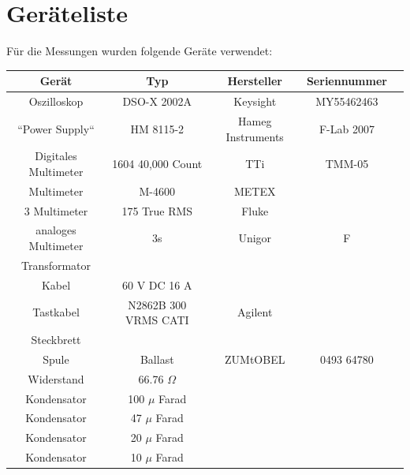 \documentclass[11pt,ngerman]{scrartcl}
\begin{document}
\section{Geräteliste}

\noindent Für die Messungen wurden folgende Geräte verwendet:

\begin{center}
	\begin{tabular}{|c|c|c|c|c|} \hline
		\textbf{Gerät}       & \textbf{Typ}         & \textbf{Hersteller} & \textbf{Seriennummer} \\ \hline

		Oszilloskop          & DSO-X 2002A          & Keysight            & MY55462463            \\ \hline
		``Power Supply``     & HM 8115-2            & Hameg Instruments   & F-Lab 2007            \\ \hline
		Digitales Multimeter & 1604 40,000 Count    & TTi                 & TMM-05                \\ \hline
		Multimeter           & M-4600               & METEX               &                       \\ \hline
		3 Multimeter         & 175 True RMS         & Fluke               &                       \\ \hline
		analoges Multimeter  & 3s                   & Unigor              & F                     \\ \hline
		Transformator        &                      &                     &                       \\ \hline
		Kabel                & 60 V DC 16 A         &                     &                       \\ \hline
		Tastkabel            & N2862B 300 VRMS CATI & Agilent             &                       \\ \hline
		Steckbrett           &                      &                     &                       \\ \hline
		Spule                & Ballast              & ZUMtOBEL            & 0493 64780            \\ \hline
		Widerstand           & 66.76 $\Omega$       &                     &                       \\ \hline
		Kondensator          & 100 $\mu$ Farad      &                     &                       \\ \hline
		Kondensator          & 47 $\mu$ Farad       &                     &                       \\ \hline
		Kondensator          & 20 $\mu$ Farad       &                     &                       \\ \hline
		Kondensator          & 10 $\mu$ Farad       &                     &                       \\ \hline
	\end{tabular}
\end{center}
\label{tab:material}
\end{document}
